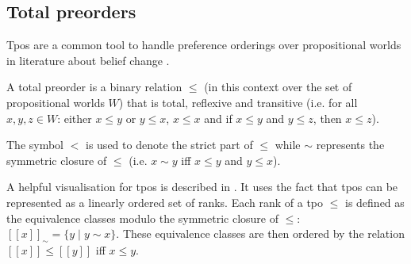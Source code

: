 \documentclass[english, 12pt]{scrartcl}
\theoremstyle{definition}
\theoremstyle{definition}
\theoremstyle{definition}
\begin{document}
\subsection{Total preorders}
Tpos are a common tool to handle preference orderings over propositional worlds in literature about belief change \cite{Booth2011}.

A total preorder is a binary relation $\leq$ (in this context over the set of propositional worlds $W$) that is total, reflexive and transitive (i.e. for all $x, y, z \in W$: either $x \leq y$ or $y \leq x$, $x \leq x$ and if $x \leq y$ and $y \leq z$, then $x \leq z$).

The symbol $<$ is used to denote the strict part of $\leq$ while $\sim$ represents the symmetric closure of $\leq$ (i.e. $x \sim y$ iff $x \leq y$ and $y \leq x$).

A helpful visualisation for tpos is described in \cite{Booth2006}. It uses the fact that tpos can be represented as a linearly ordered set of ranks. Each rank of a tpo $\leq$ is defined as the equivalence classes modulo the symmetric closure of $\leq$: $[[x]]_{\sim} = \{y \mid y \sim x\}$. These equivalence classes are then ordered by the relation $[[x]] \leq [[y]]$ iff $x \leq y$.
\end{document}

